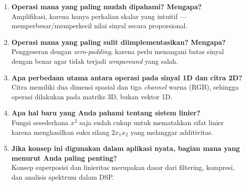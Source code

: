 \documentclass[12pt,a4paper]{article}
\begin{document}
\begin{enumerate}
\item \textbf{Operasi mana yang paling mudah dipahami? Mengapa?} \\
Amplifikasi, karena hanya perkalian skalar yang intuitif — memperbesar/memperkecil nilai sinyal secara proporsional.
\item \textbf{Operasi mana yang paling sulit diimplementasikan? Mengapa?} \\
Penggeseran dengan \textit{zero-padding}, karena perlu menangani batas sinyal dengan benar agar tidak terjadi \textit{wraparound} yang salah.
\item \textbf{Apa perbedaan utama antara operasi pada sinyal 1D dan citra 2D?} \\
Citra memiliki dua dimensi spasial dan tiga \textit{channel} warna (RGB), sehingga operasi dilakukan pada matriks 3D, bukan vektor 1D.
\item \textbf{Apa hal baru yang Anda pahami tentang sistem linier?} \\
Fungsi sesederhana $x^2$ saja sudah cukup untuk mematahkan sifat linier karena menghasilkan suku silang $2x_1x_2$ yang melanggar additivitas.
\item \textbf{ Jika konsep ini digunakan dalam aplikasi nyata, bagian mana yang menurut Anda paling penting?} \\
Konsep superposisi dan linieritas merupakan dasar dari filtering, kompresi, dan analisis spektrum dalam DSP.
\end{enumerate}
\end{document}
